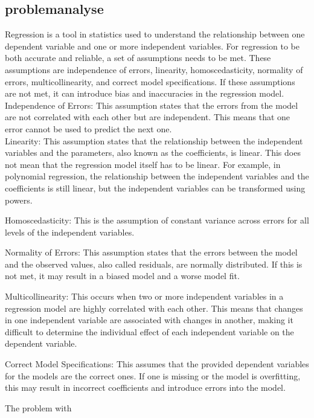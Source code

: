 \subsection{problemanalyse}

Regression is a tool in statistics used to understand the relationship between one dependent variable and one or more independent variables. For regression to be both accurate and reliable, a set of assumptions needs to be met. These assumptions are independence of errors, linearity, homoscedasticity, normality of errors, multicollinearity, and correct model specifications. If these assumptions are not met, it can introduce bias and inaccuracies in the regression model.\\
\newline
Independence of Errors: This assumption states that the errors from the model are not correlated with each other but are independent. This means that one error cannot be used to predict the next one.\\
\newline
Linearity: This assumption states that the relationship between the independent variables and the parameters, also known as the coefficients, is linear. This does not mean that the regression model itself has to be linear. For example, in polynomial regression, the relationship between the independent variables and the coefficients is still linear, but the independent variables can be transformed using powers.

Homoscedasticity: This is the assumption of constant variance across errors for all levels of the independent variables.

Normality of Errors: This assumption states that the errors between the model and the observed values, also called residuals, are normally distributed. If this is not met, it may result in a biased model and a worse model fit.

Multicollinearity: This occurs when two or more independent variables in a regression model are highly correlated with each other. This means that changes in one independent variable are associated with changes in another, making it difficult to determine the individual effect of each independent variable on the dependent variable.

Correct Model Specifications: This assumes that the provided dependent variables for the models are the correct ones. If one is missing or the model is overfitting, this may result in incorrect coefficients and introduce errors into the model.

The problem with